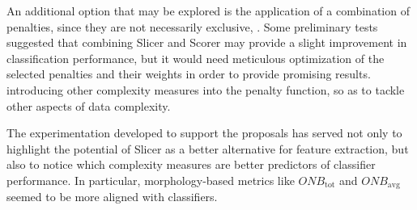 An additional option that may be explored is the application of a combination of penalties, since they are not necessarily exclusive, . Some preliminary tests suggested that combining Slicer and Scorer may provide a slight improvement in classification performance, but it would need meticulous optimization of the selected penalties and their weights in order to provide promising results.  introducing other complexity measures into the penalty function, so as to tackle other aspects of data complexity.

The experimentation developed to support the proposals has served not only to highlight the potential of Slicer as a better alternative for feature extraction, but also to notice which complexity measures are better predictors of classifier performance. In particular, morphology-based metrics like $\textit{ONB}_{\text{tot}}$ and $\textit{ONB}_{\text{avg}}$ seemed to be more aligned with classifiers.













